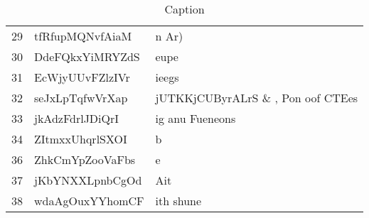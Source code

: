 \begin{center}
\begin{table}
\begin{tabular}{ |l|l|l| }
            29 & tfRfupMQNvfAiaM & n Ar) \\
            30 & DdeFQkxYiMRYZdS & eupe \\
            31 & EcWjyUUvFZlzIVr & ieegs \\
            32 & seJxLpTqfwVrXap & jUTKKjCUByrALrS \& , Pon oof CTEes \\
            33 & jkAdzFdrlJDiQrI & ig anu Fueneons \\
            34 & ZItmxxUhqrlSXOI & b \\
            36 & ZhkCmYpZooVaFbs & e \\
            37 & jKbYNXXLpnbCgOd & Ait \\
            38 & wdaAgOuxYYhomCF & ith shune \\
            \hline
        \end{tabular}
        \caption{Caption}
        \label{tab:first-sequences}
    \end{table}
\end{center}


